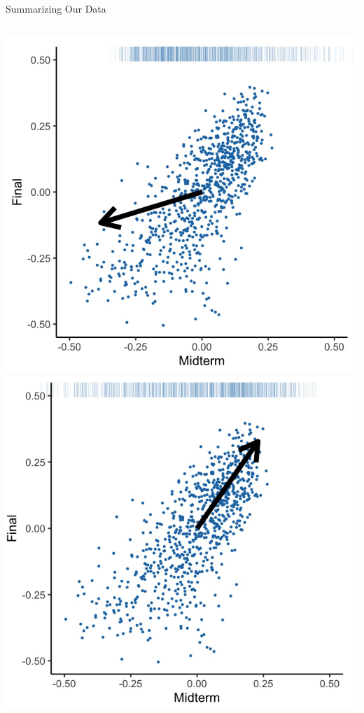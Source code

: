 \documentclass[aspectratio=169]{../latex_main/tntbeamer}  %
\begin{document}
\begin{frame}{Summarizing Our Data}
\begin{columns}
\begin{column}{.5\textwidth}
	                    \includegraphics[scale=.1]{vect3}
	                    \includegraphics[scale=.1]{vect4}
	                    
	        \end{column}
	    \end{columns}
	\end{frame}
	
\end{document}
